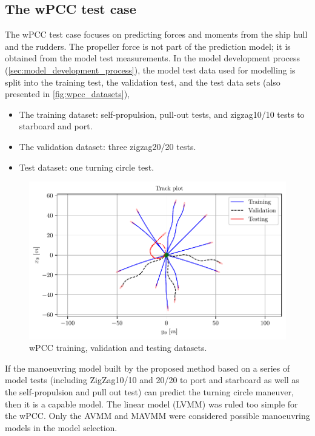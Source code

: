 \subsection{The wPCC test case}
\label{\detokenize{05.01_case_studies:the-wpcc-test-scenarios}}
The wPCC test case focuses on predicting forces and moments from the ship hull and the rudders. The propeller force is not part of the prediction model; it is obtained from the model test measurements.
In the model development process (\autoref{sec:model_development_process}), the model test data used for modelling is split into the training test, the validation test, and the test data sets (also presented in \autoref{fig:wpcc_datasets}), 
\begin{itemize}
    \item The training dataset: self-propulsion, pull-out tests, and zigzag10/10 tests to starboard and port.
    \item The validation dataset: three zigzag20/20 tests.
    \item Test dataset: one turning circle test.
\end{itemize}
\begin{figure}[h!]
\centering
\includegraphics[width= 1.0\linewidth]{kappa/images/3.pdf}
\caption{wPCC training, validation and testing datasets.}
\label{fig:wpcc_datasets}
\end{figure}
\noindent If the manoeuvring model built by the proposed method based on a series of model tests (including ZigZag10/10 and 20/20 to port and starboard as well as the self-propulsion and pull out test) \cite{imo_standards_2002} can predict the turning circle maneuver, then it is a capable model. The linear model (LVMM) was ruled too simple for the wPCC. Only the AVMM and MAVMM were considered possible manoeuvring models in the model selection.
